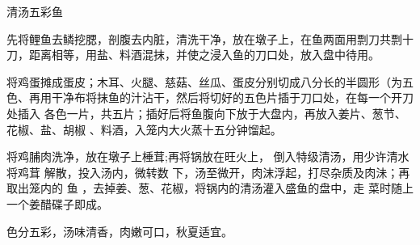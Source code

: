 \begin{recipe}[麒麟鱼]{清汤五彩鱼}

\ingredients


\cooking

\step 先将鲤鱼去鳞挖腮，剖腹去内脏，清洗干净，放在墩子上，在鱼两面用剽刀共剽十
刀，距离相等，用盐、料酒混抹，并使之浸入鱼的刀口处，放入盘中待用。

\step 将鸡蛋摊成蛋皮；木耳、火腿、慈菇、丝瓜、蛋皮分别切成八分长的半圆形（为五
色、再用干净布将抹鱼的汁沾干，然后将切好的五色片插于刀口处，在每一个开刀处插入
各色一片，共五片；插好后将鱼腹向下放于大盘内，再放入姜片、葱节、花椒、盐、胡椒
、料酒，入笼内大火蒸十五分钟馏起。

将鸡脯肉洗净，放在墩子上棰茸;再将锅放在旺火上， 倒入特级清汤，用少许清水将鸡茸
解散，投入汤内，微转数 下，汤至微开，肉沫浮起，打尽杂质及肉沬；再取出笼内的 鱼
，去掉姜、葱、花椒，将锅内的清汤灌入盛鱼的盘中，走 菜时随上一个姜醋碟子即成。

\notes

色分五彩，汤味清香，肉嫩可口，秋夏适宜。

\end{recipe}


